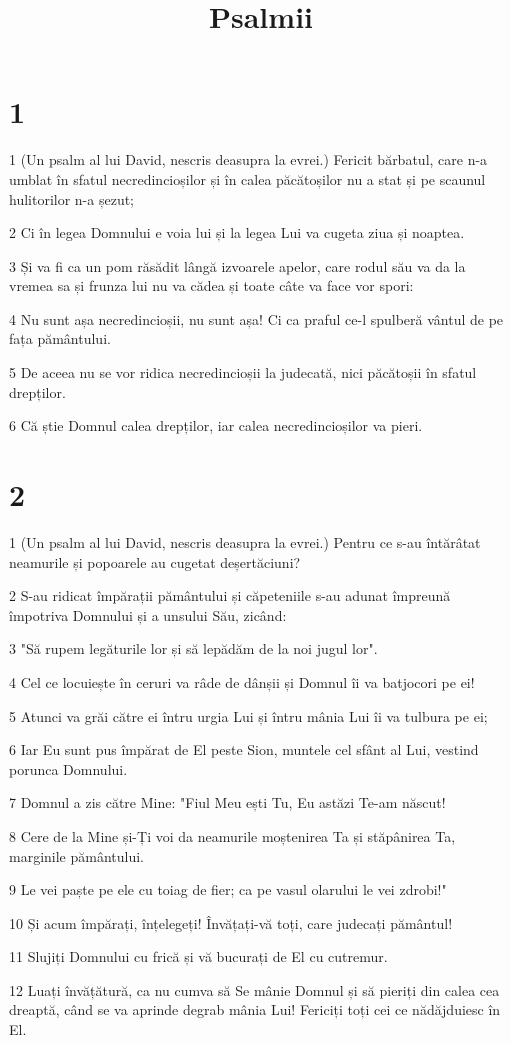 

\title{Psalmii}


\chapter{1}

\par 1 (Un psalm al lui David, nescris deasupra la evrei.) Fericit bărbatul, care n-a umblat în sfatul necredincioșilor și în calea păcătoșilor nu a stat și pe scaunul hulitorilor n-a șezut;
\par 2 Ci în legea Domnului e voia lui și la legea Lui va cugeta ziua și noaptea.
\par 3 Și va fi ca un pom răsădit lângă izvoarele apelor, care rodul său va da la vremea sa și frunza lui nu va cădea și toate câte va face vor spori:
\par 4 Nu sunt așa necredincioșii, nu sunt așa! Ci ca praful ce-l spulberă vântul de pe fața pământului.
\par 5 De aceea nu se vor ridica necredincioșii la judecată, nici păcătoșii în sfatul drepților.
\par 6 Că știe Domnul calea drepților, iar calea necredincioșilor va pieri.

\chapter{2}

\par 1 (Un psalm al lui David, nescris deasupra la evrei.) Pentru ce s-au întărâtat neamurile și popoarele au cugetat deșertăciuni?
\par 2 S-au ridicat împărații pământului și căpeteniile s-au adunat împreună împotriva Domnului și a unsului Său, zicând:
\par 3 "Să rupem legăturile lor și să lepădăm de la noi jugul lor".
\par 4 Cel ce locuiește în ceruri va râde de dânșii și Domnul îi va batjocori pe ei!
\par 5 Atunci va grăi către ei întru urgia Lui și întru mânia Lui îi va tulbura pe ei;
\par 6 Iar Eu sunt pus împărat de El peste Sion, muntele cel sfânt al Lui, vestind porunca Domnului.
\par 7 Domnul a zis către Mine: "Fiul Meu ești Tu, Eu astăzi Te-am născut!
\par 8 Cere de la Mine și-Ți voi da neamurile moștenirea Ta și stăpânirea Ta, marginile pământului.
\par 9 Le vei paște pe ele cu toiag de fier; ca pe vasul olarului le vei zdrobi!"
\par 10 Și acum împărați, înțelegeți! Învățați-vă toți, care judecați pământul!
\par 11 Slujiți Domnului cu frică și vă bucurați de El cu cutremur.
\par 12 Luați învățătură, ca nu cumva să Se mânie Domnul și să pieriți din calea cea dreaptă, când se va aprinde degrab mânia Lui! Fericiți toți cei ce nădăjduiesc în El.

